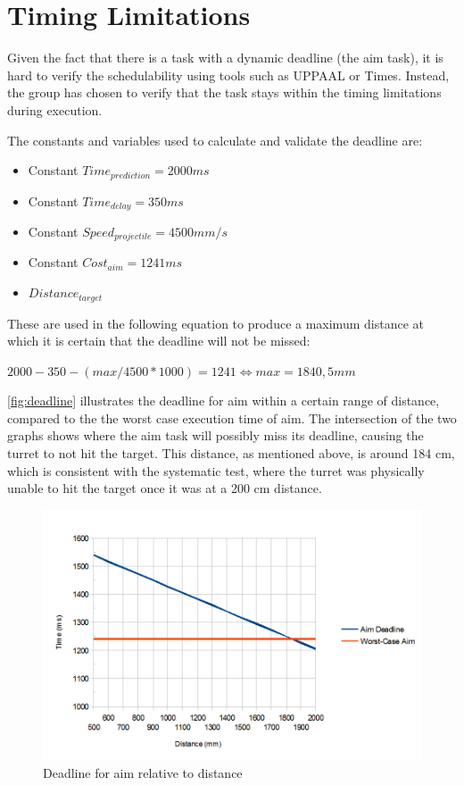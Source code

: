 \section{Timing Limitations}
Given the fact that there is a task with a dynamic deadline (the aim task), it is hard to verify the schedulability using tools such as UPPAAL or Times. Instead, the group has chosen to verify that the task stays within the timing limitations during execution.

The constants and variables used to calculate and validate the deadline are:
\begin{itemize}
	\item Constant $Time_{prediction} = 2000 ms$
	\item Constant $Time_{delay} = 350 ms$
	\item Constant $Speed_{projectile} = 4500 mm/s$
	\item Constant $Cost_{aim} = 1241 ms$ 
	\item $Distance_{target}$
\end{itemize}

These are used in the following equation to produce a maximum distance at which it is certain that the deadline will not be missed: 

$2000-350-(max/4500*1000)=1241 \Leftrightarrow max = 1840,5 mm$

\autoref{fig:deadline} illustrates the deadline for aim within a certain range of distance, compared to the the worst case execution time of aim. The intersection of the two graphs shows where the aim task will possibly miss its deadline, causing the turret to not hit the target. This distance, as mentioned above, is around 184 cm, which is consistent with the systematic test, where the turret was physically unable to hit the target once it was at a 200 cm distance. 

\begin{figure}
	\includegraphics[scale=0.5]{img/deadline.png}
	\caption{Deadline for aim relative to distance}
	\label{fig:deadline}
\end{figure}

